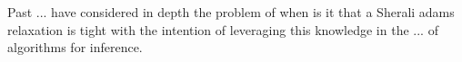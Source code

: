 Past ... have considered in depth the problem of when is it that a Sherali adams relaxation is tight with the intention of leveraging this knowledge in the ... of algorithms for inference. 


